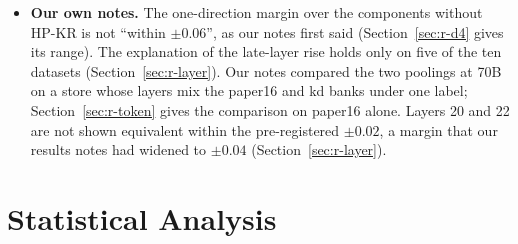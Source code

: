 \begin{itemize}
\item \textbf{Our own notes.}
The one-direction margin over the components without HP-KR is not ``within $\pm0.06$'', as our notes first said (Section~\ref{sec:r-d4} gives its range). %
The explanation of the late-layer rise holds only on five of the ten datasets (Section~\ref{sec:r-layer}). %
Our notes compared the two poolings at 70B on a store whose layers mix the paper16 and kd banks under one label; Section~\ref{sec:r-token} gives the comparison on paper16 alone. %
Layers 20 and 22 are not shown equivalent within the pre-registered $\pm0.02$, a margin that our results notes had widened to $\pm0.04$ (Section~\ref{sec:r-layer}). %
\end{itemize}

\section{Statistical Analysis}
\label{sec:r-stats}

